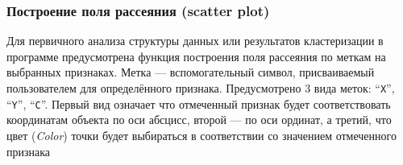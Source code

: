 \documentclass[12pt,twoside,a4paper,tikz,border=5]{refart}
\begin{document}
\newpage
\subsubsection{Построение поля рассеяния (scatter plot)}
\label{subsubsec:scatterplot}

Для первичного анализа структуры данных или результатов кластеризации в программе предусмотрена функция построения поля рассеяния по меткам на выбранных признаках. Метка --- вспомогательный символ, присваиваемый пользователем для  определённого признака.  Предусмотрено 3 вида меток: ``\texttt{X}'', ``\texttt{Y}'', ``\texttt{C}''. Первый вид означает что отмеченный признак будет соответствовать координатам объекта по оси абсцисс, второй --- по оси ординат, а третий, что цвет (\textit{Color}) точки будет выбираться в соответствии со значением отмеченного признака
\end{document}
